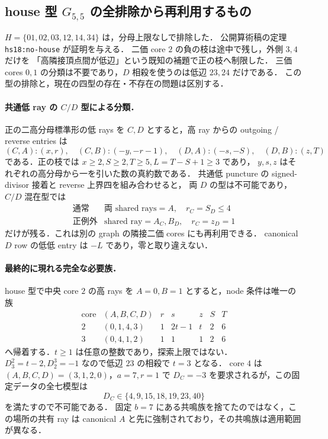 \subsection{house 型 \texorpdfstring{$G_{5,5}$}{G5,5} の全排除から再利用するもの}
\label{nh18:house}

$H=\{01,02,03,12,14,34\}$ は，分母上限なしで排除した．
公開算術稿の定理 \texttt{hs18:no-house} が証明を与える．
二価 core $2$ の負の枝は途中で残し，外側 $3,4$ だけを
「高隣接頂点間が低辺」という既知の補題で正の枝へ制限した．
三価 cores $0,1$ の分類は不要であり，$D$ 相殺を使うのは低辺 $23,24$ だけである．
この型の排除と，現在の四型の存在・不存在の問題は区別する．

\paragraph{共通低 ray の $C/D$ 型による分類．}
正の二高分母標準形の低 rays を $C,D$ とすると，高 ray からの
outgoing / reverse entries は
\[
 (C,A):(x,r),\quad(C,B):(-y,-r-1),\quad
 (D,A):(-s,-S),\quad(D,B):(z,T)
\]
である．正の枝では $x\ge2,S\ge2,T\ge5,L=T-S+1\ge3$ であり，
$y,s,z$ はそれぞれの高分母から一を引いた数の真約数である．
共通低 puncture の signed-divisor 接着と reverse 上界四を組み合わせると，
両 $D$ の型は不可能であり，$C/D$ 混在型では
\[
 \begin{array}{c|c}
 \text{通常}&\text{両 shared rays}=A,\quad r_C=S_D\le4\\
 \text{正例外}&\text{shared ray}=A_C,B_D,\quad r_C=z_D=1
 \end{array}
\]
だけが残る．これは別の graph の隣接二価 cores にも再利用できる．
canonical $D$ row の低低 entry は $-L$ であり，零と取り違えない．

\paragraph{最終的に現れる完全な必要族．}
house 型で中央 core $2$ の高 rays を $A=0,B=1$ とすると，node 条件は唯一の族
\[
 \begin{array}{c|c|ccccc}
 \text{core}&(A,B,C,D)&r&s&z&S&T\\\hline
 2&(0,1,4,3)&1&2t-1&t&2&6\\
 3&(0,4,1,2)&1&1&1&2&6
 \end{array}
\]
へ帰着する．$t\ge1$ は任意の整数であり，探索上限ではない．
$D^2_3=t-2,D^3_2=-1$ なので低辺 $23$ の相殺で $t=3$ となる．
core $4$ は $(A,B,C,D)=(3,1,2,0)$，$a=7,r=1$ で
$D_C=-3$ を要求されるが，この固定データの全七模型は
\[
 D_C\in\{4,9,15,18,19,23,40\}
\]
を満たすので不可能である．
固定 $b=7$ にある共鳴族を捨てたのではなく，この場所の共有 ray は
canonical $A$ と先に強制されており，その共鳴族は適用範囲が異なる．

